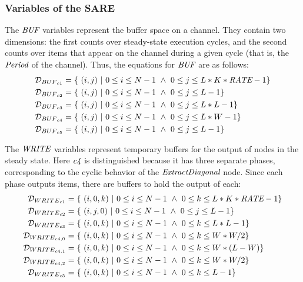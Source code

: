 \subsubsection{Variables of the SARE}


The $\mbox{\it BUF}$ variables represent the buffer space on a channel.
They contain two dimensions: the first counts over steady-state
execution cycles, and the second counts over items that appear on the
channel during a given cycle (that is, the $\mbox{\it Period}$ of the
channel).  Thus, the equations for $\mbox{\it BUF}$ are as follows:
{\scriptsize
\begin{align*}
{\cal D}_{{BUF}_{c1}} &= \{ ~(i,j)~|~0 \le i \le N - 1 ~\wedge~ 0 \le j \le L * K * \mt{RATE} - 1\} \\
{\cal D}_{{BUF}_{c2}} &= \{ ~(i,j)~|~0 \le i \le N - 1 ~\wedge~ 0 \le j \le L - 1\} \\
{\cal D}_{{BUF}_{c3}} &= \{ ~(i,j)~|~0 \le i \le N - 1 ~\wedge~ 0 \le j \le L * L - 1\} \\
{\cal D}_{{BUF}_{c4}} &= \{ ~(i,j)~|~0 \le i \le N - 1 ~\wedge~ 0 \le j \le L * W - 1\} \\
{\cal D}_{{BUF}_{c5}} &= \{ ~(i,j)~|~0 \le i \le N - 1 ~\wedge~ 0 \le j \le L - 1\}
\end{align*}}


The $\mbox{\it WRITE}$ variables represent temporary buffers for the output
of nodes in the steady state.  Here $\mbox{\it c4}$ is distinguished because
it has three separate phases, corresponding to the cyclic behavior of
the $\mbox{\it ExtractDiagonal}$ node.  Since each phase outputs items,
there are buffers to hold the output of each:
{\scriptsize
\begin{align*}
{\cal D}_{{WRITE}_{c1}} &= \{~(i,0,k)~|~0 \le i \le N-1 ~\wedge~ 0 \le k \le L * K * \mt{RATE} - 1\} \\
{\cal D}_{{WRITE}_{c2}} &= \{~(i,j,0)~|~0 \le i \le N-1 ~\wedge~ 0 \le j \le L - 1 \} \\
{\cal D}_{{WRITE}_{c3}} &= \{~(i,0,k)~|~0 \le i \le N-1 ~\wedge~ 0 \le k \le L * L - 1\} \\
{\cal D}_{{WRITE}_{{c4}, 0}} &= \{~(i,0,k)~|~0 \le i \le N-1 ~\wedge~ 0 \le k \le W * W / 2\} \\
{\cal D}_{{WRITE}_{{c4}, 1}} &= \{~(i,0,k)~|~0 \le i \le N-1 ~\wedge~ 0 \le k \le W * (L - W) \} \\
{\cal D}_{{WRITE}_{{c4}, 2}} &= \{~(i,0,k)~|~0 \le i \le N-1 ~\wedge~ 0 \le k \le W * W / 2 \} \\
{\cal D}_{{WRITE}_{c5}} &= \{~(i,0,k)~|~0 \le i \le N-1 ~\wedge~ 0 \le k \le L - 1\} \\
\end{align*}}

